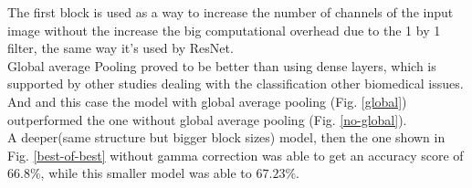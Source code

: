 \documentclass[25pt, a0paper, portrait]{tikzposter}
\begin{document}
\begin{columns}
{		The first block is used as a way to increase the number of channels of the input image without the increase the 
		big computational overhead due to the 1 by 1 filter, the same way it's used by ResNet\cite{resnet}.\\

		Global average Pooling proved to be better than using dense layers, which is supported by other studies dealing 
		with the classification other biomedical issues\cite{brain-cell-class, breast-cell-class}. And and this case the
		model with global average pooling (Fig. \ref{global}) outperformed the one without global average pooling (Fig.
		\ref{no-global}).\\

		A deeper(same structure but bigger block sizes) model, then the one shown in Fig. \ref{best-of-best} without gamma correction was able to get an accuracy 
		score of $66.8\%$, while this smaller model was able to $67.23\%$.

}
\end{columns}
\end{document}
